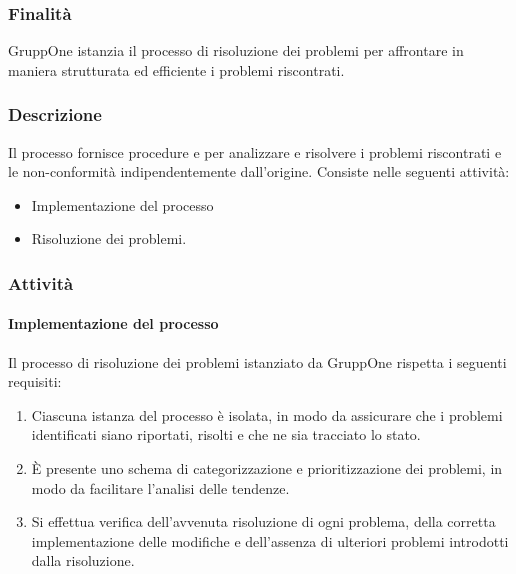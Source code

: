 \documentclass[../../norme-di-progetto.tex]{subfiles}
\begin{document}
\subsubsection{Finalità}%
\label{subs:processo_di_risoluzione_dei_problemi/finalita}

GruppOne istanzia il processo di risoluzione dei problemi per affrontare in maniera strutturata ed efficiente i problemi riscontrati.

\subsubsection{Descrizione}%
\label{subs:processo_di_risoluzione_dei_problemi/descrizione}

Il processo fornisce procedure e per analizzare e risolvere i problemi riscontrati e le non-conformità indipendentemente dall'origine.
Consiste nelle seguenti attività:

\begin{itemize}
  \item Implementazione del processo
  \item Risoluzione dei problemi.
\end{itemize}

\subsubsection{Attività}%
\label{subs:processo_di_risoluzione_dei_problemi/attivita}

\paragraph{Implementazione del processo}%
\label{par:implementazione_del_processo}

Il processo di risoluzione dei problemi istanziato da GruppOne rispetta i seguenti requisiti:

\begin{enumerate}
  \item Ciascuna istanza del processo è isolata, in modo da assicurare che i problemi identificati siano riportati, risolti e che ne sia tracciato lo stato.
  \item È presente uno schema di categorizzazione e prioritizzazione dei problemi, in modo da facilitare l'analisi delle tendenze.
  \item Si effettua verifica dell'avvenuta risoluzione di ogni problema, della corretta implementazione delle modifiche e dell'assenza di ulteriori problemi introdotti dalla risoluzione.
\end{enumerate}
\end{document}
